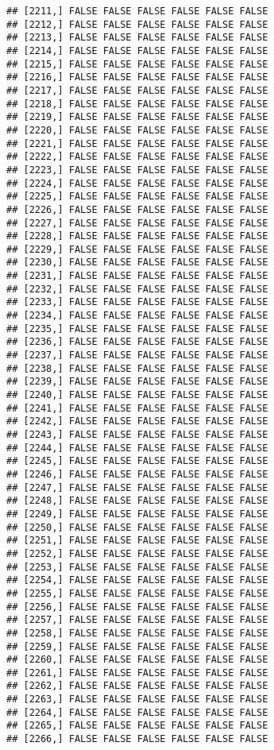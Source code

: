 \documentclass[
]{article}
\begin{document}
\begin{verbatim}
## [2211,] FALSE FALSE FALSE FALSE FALSE FALSE
## [2212,] FALSE FALSE FALSE FALSE FALSE FALSE
## [2213,] FALSE FALSE FALSE FALSE FALSE FALSE
## [2214,] FALSE FALSE FALSE FALSE FALSE FALSE
## [2215,] FALSE FALSE FALSE FALSE FALSE FALSE
## [2216,] FALSE FALSE FALSE FALSE FALSE FALSE
## [2217,] FALSE FALSE FALSE FALSE FALSE FALSE
## [2218,] FALSE FALSE FALSE FALSE FALSE FALSE
## [2219,] FALSE FALSE FALSE FALSE FALSE FALSE
## [2220,] FALSE FALSE FALSE FALSE FALSE FALSE
## [2221,] FALSE FALSE FALSE FALSE FALSE FALSE
## [2222,] FALSE FALSE FALSE FALSE FALSE FALSE
## [2223,] FALSE FALSE FALSE FALSE FALSE FALSE
## [2224,] FALSE FALSE FALSE FALSE FALSE FALSE
## [2225,] FALSE FALSE FALSE FALSE FALSE FALSE
## [2226,] FALSE FALSE FALSE FALSE FALSE FALSE
## [2227,] FALSE FALSE FALSE FALSE FALSE FALSE
## [2228,] FALSE FALSE FALSE FALSE FALSE FALSE
## [2229,] FALSE FALSE FALSE FALSE FALSE FALSE
## [2230,] FALSE FALSE FALSE FALSE FALSE FALSE
## [2231,] FALSE FALSE FALSE FALSE FALSE FALSE
## [2232,] FALSE FALSE FALSE FALSE FALSE FALSE
## [2233,] FALSE FALSE FALSE FALSE FALSE FALSE
## [2234,] FALSE FALSE FALSE FALSE FALSE FALSE
## [2235,] FALSE FALSE FALSE FALSE FALSE FALSE
## [2236,] FALSE FALSE FALSE FALSE FALSE FALSE
## [2237,] FALSE FALSE FALSE FALSE FALSE FALSE
## [2238,] FALSE FALSE FALSE FALSE FALSE FALSE
## [2239,] FALSE FALSE FALSE FALSE FALSE FALSE
## [2240,] FALSE FALSE FALSE FALSE FALSE FALSE
## [2241,] FALSE FALSE FALSE FALSE FALSE FALSE
## [2242,] FALSE FALSE FALSE FALSE FALSE FALSE
## [2243,] FALSE FALSE FALSE FALSE FALSE FALSE
## [2244,] FALSE FALSE FALSE FALSE FALSE FALSE
## [2245,] FALSE FALSE FALSE FALSE FALSE FALSE
## [2246,] FALSE FALSE FALSE FALSE FALSE FALSE
## [2247,] FALSE FALSE FALSE FALSE FALSE FALSE
## [2248,] FALSE FALSE FALSE FALSE FALSE FALSE
## [2249,] FALSE FALSE FALSE FALSE FALSE FALSE
## [2250,] FALSE FALSE FALSE FALSE FALSE FALSE
## [2251,] FALSE FALSE FALSE FALSE FALSE FALSE
## [2252,] FALSE FALSE FALSE FALSE FALSE FALSE
## [2253,] FALSE FALSE FALSE FALSE FALSE FALSE
## [2254,] FALSE FALSE FALSE FALSE FALSE FALSE
## [2255,] FALSE FALSE FALSE FALSE FALSE FALSE
## [2256,] FALSE FALSE FALSE FALSE FALSE FALSE
## [2257,] FALSE FALSE FALSE FALSE FALSE FALSE
## [2258,] FALSE FALSE FALSE FALSE FALSE FALSE
## [2259,] FALSE FALSE FALSE FALSE FALSE FALSE
## [2260,] FALSE FALSE FALSE FALSE FALSE FALSE
## [2261,] FALSE FALSE FALSE FALSE FALSE FALSE
## [2262,] FALSE FALSE FALSE FALSE FALSE FALSE
## [2263,] FALSE FALSE FALSE FALSE FALSE FALSE
## [2264,] FALSE FALSE FALSE FALSE FALSE FALSE
## [2265,] FALSE FALSE FALSE FALSE FALSE FALSE
## [2266,] FALSE FALSE FALSE FALSE FALSE FALSE

\end{verbatim}
\end{document}
